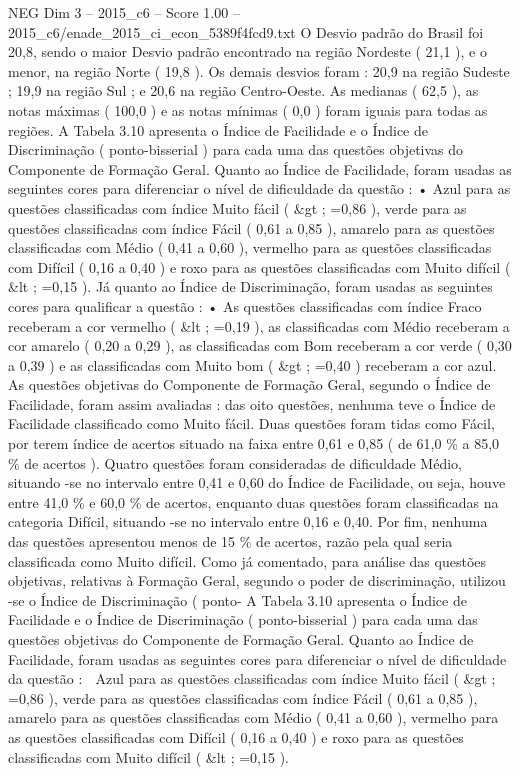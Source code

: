 \begin{textsample}{NEG Dim 3 – 2015\_c6 – Score 1.00 – 2015\_c6/enade\_2015\_ci\_econ\_5389f4fcd9.txt}
O Desvio padrão do Brasil foi 20,8, sendo o maior Desvio padrão encontrado na região Nordeste ( 21,1 ), e o menor, na região Norte ( 19,8 ).
Os demais desvios foram : 20,9 na região Sudeste ; 19,9 na região Sul ; e 20,6 na região Centro-Oeste.
As medianas ( 62,5 ), as notas máximas ( 100,0 ) e as notas mínimas ( 0,0 ) foram iguais para todas as regiões.
A Tabela 3.10 apresenta o Índice de Facilidade e o Índice de Discriminação ( ponto-bisserial ) para cada uma das questões objetivas do Componente de Formação Geral.
Quanto ao Índice de Facilidade, foram usadas as seguintes cores para diferenciar o nível de dificuldade da questão : • Azul para as questões classificadas com índice Muito fácil ( \&gt ; =0,86 ), verde para as questões classificadas com índice Fácil ( 0,61 a 0,85 ), amarelo para as questões classificadas com Médio ( 0,41 a 0,60 ), vermelho para as questões classificadas com Difícil ( 0,16 a 0,40 ) e roxo para as questões classificadas com Muito difícil ( \&lt ; =0,15 ).
Já quanto ao Índice de Discriminação, foram usadas as seguintes cores para qualificar a questão : • As questões classificadas com índice Fraco receberam a cor vermelho ( \&lt ; =0,19 ), as classificadas com Médio receberam a cor amarelo ( 0,20 a 0,29 ), as classificadas com Bom receberam a cor verde ( 0,30 a 0,39 ) e as classificadas com Muito bom ( \&gt ; =0,40 ) receberam a cor azul.
As questões objetivas do Componente de Formação Geral, segundo o Índice de Facilidade, foram assim avaliadas : das oito questões, nenhuma teve o Índice de Facilidade classificado como Muito fácil.
Duas questões foram tidas como Fácil, por terem índice de acertos situado na faixa entre 0,61 e 0,85 ( de 61,0 \% a 85,0 \% de acertos ).
Quatro questões foram consideradas de dificuldade Médio, situando -se no intervalo entre 0,41 e 0,60 do Índice de Facilidade, ou seja, houve entre 41,0 \% e 60,0 \% de acertos, enquanto duas questões foram classificadas na categoria Difícil, situando -se no intervalo entre 0,16 e 0,40.
Por fim, nenhuma das questões apresentou menos de 15 \% de acertos, razão pela qual seria classificada como Muito difícil.
Como já comentado, para análise das questões objetivas, relativas à Formação Geral, segundo o poder de discriminação, utilizou -se o Índice de Discriminação ( ponto- A Tabela 3.10 apresenta o Índice de Facilidade e o Índice de Discriminação ( ponto-bisserial ) para cada uma das questões objetivas do Componente de Formação Geral.
Quanto ao Índice de Facilidade, foram usadas as seguintes cores para diferenciar o nível de dificuldade da questão :  Azul para as questões classificadas com índice Muito fácil ( \&gt ; =0,86 ), verde para as questões classificadas com índice Fácil ( 0,61 a 0,85 ), amarelo para as questões classificadas com Médio ( 0,41 a 0,60 ), vermelho para as questões classificadas com Difícil ( 0,16 a 0,40 ) e roxo para as questões classificadas com Muito difícil ( \&lt ; =0,15 ).

\end{textsample}
